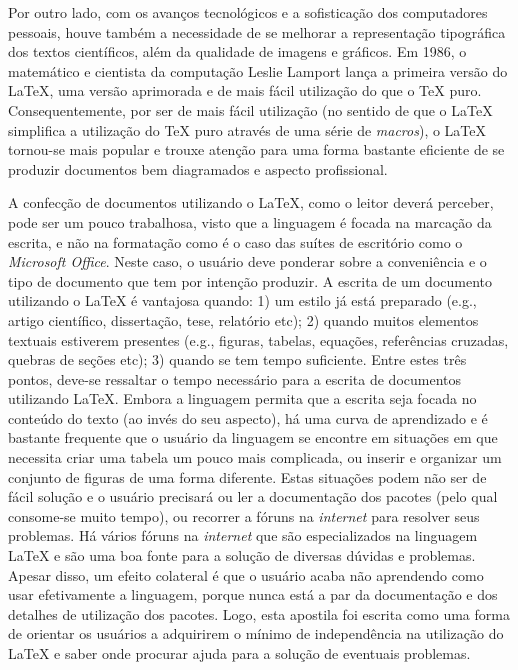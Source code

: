 Por outro lado, com os avanços tecnológicos e a sofisticação dos computadores pessoais, houve também a necessidade de se melhorar a representação tipográfica dos textos científicos, além da qualidade de imagens e gráficos. Em 1986, o matemático e cientista da computação Leslie Lamport lança a primeira versão do \LaTeX{}, uma versão aprimorada e de mais fácil utilização do que o \TeX{} puro. Consequentemente, por ser de mais fácil utilização (no sentido de que o \LaTeX{} simplifica a utilização do \TeX{} puro através de uma série de \textit{macros}), o \LaTeX{} tornou-se mais popular e trouxe atenção para uma forma bastante eficiente de se produzir documentos bem diagramados e aspecto profissional.

A confecção de documentos utilizando o \LaTeX{}, como o leitor deverá perceber, pode ser um pouco trabalhosa, visto que a linguagem é focada na marcação da escrita, e não na formatação como é o caso das suítes de escritório como o \textit{Microsoft Office}. Neste caso, o usuário deve ponderar sobre a conveniência e o tipo de documento que tem por intenção produzir. A escrita de um documento utilizando o \LaTeX{} é vantajosa quando: 1) um estilo já está preparado (e.g., artigo científico, dissertação, tese, relatório etc); 2) quando muitos elementos textuais estiverem presentes (e.g., figuras, tabelas, equações, referências cruzadas, quebras de seções etc); 3) quando se tem tempo suficiente. Entre estes três pontos, deve-se ressaltar o tempo necessário para a escrita de documentos utilizando \LaTeX{}. Embora a linguagem permita que a escrita seja focada no conteúdo do texto (ao invés do seu aspecto), há uma curva de aprendizado e é bastante frequente que o usuário da linguagem se encontre em situações em que necessita criar uma tabela um pouco mais complicada, ou inserir e organizar um conjunto de figuras de uma forma diferente. Estas situações podem não ser de fácil solução e o usuário precisará ou ler a documentação dos pacotes (pelo qual consome-se muito tempo), ou recorrer a fóruns na \textit{internet} para resolver seus problemas. Há vários fóruns na \textit{internet} que são especializados na linguagem \LaTeX{} e são uma boa fonte para a solução de diversas dúvidas e problemas. Apesar disso, um efeito colateral é que o usuário acaba não aprendendo como usar efetivamente a linguagem, porque nunca está a par da documentação e dos detalhes de utilização dos pacotes. Logo, esta apostila foi escrita como uma forma de orientar os usuários a adquirirem o mínimo de independência na utilização do \LaTeX{} e saber onde procurar ajuda para a solução de eventuais problemas.

